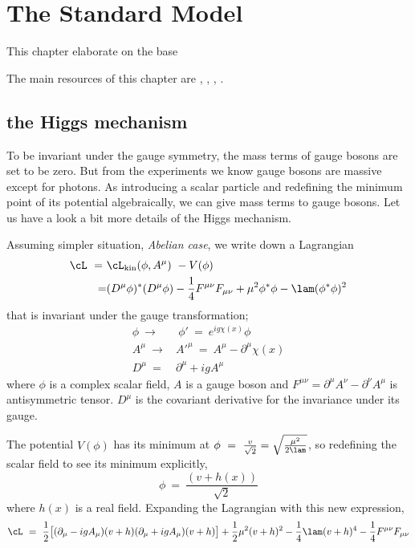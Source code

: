 \chapter{The Standard Model}
\label{sec:bsm}

This chapter elaborate on the base

The main resources of this chapter are , \cite{Koks:1976zec}, \cite{Bardon:1965sd}, 
\cite{deGroot:1978feq}.

\bigskip

\section{the Higgs mechanism}
To be invariant under the gauge symmetry, the mass terms of gauge bosons are set to be zero. 
But from the experiments we know gauge bosons are massive except for photons.
As introducing a scalar particle and redefining the minimum point of its potential algebraically, 
we can give mass terms to gauge bosons. Let us have a look a bit more details of the Higgs mechanism.

Assuming simpler situation, \emph{Abelian case}, we write down a Lagrangian 
\begin{align}
 \cL ~=~ &\cL_{\rm{kin}}(\phi,A^\mu) ~- V(\phi) \nonumber\\
  =& (D^\mu \phi)^* (D^\mu \phi) - \frac{1}{4}F^{\mu\nu}F_{\mu\nu} + \mu^2\phi^*\phi - \lam(\phi^*\phi)^2
\end{align}
that is invariant under the gauge transformation;
\begin{align}
 \phi ~\to &~\phi'~=~e^{ig\chi(x)}\phi \nonumber\\
 A^\mu ~\to& A'^\mu ~=~ A^\mu - \partial^\mu \chi(x) \nonumber\\
 D^\mu ~=~& \partial^\mu + i g A^\mu
\end{align}
where $\phi$ is a complex scalar field, $A$ is a gauge boson and $F^{\mu\nu}=\partial^\mu A^\nu - \partial^\nu A^\mu$ is antisymmetric tensor.
$D^\mu$ is the covariant derivative for the invariance under its gauge. 

The potential $V(\phi)$ has its minimum at $\phi~=~\frac{v}{\sqrt{2}}=\sqrt{\frac{\mu^2}{2\lam}}$, so 
redefining the scalar field to see its minimum explicitly, 
\begin{equation}
 \phi ~=~ \frac{(v+ h(x))}{\sqrt{2}} \nonumber
\end{equation}
where $h(x)$ is a real field. Expanding the Lagrangian with this new expression, 
\begin{align}
 \cL~=~\frac{1}{2}\big[ (\partial_\mu - igA_\mu)(v+h)(\partial_\mu + igA_\mu)(v+h) \big] 
 + \frac{1}{2}\mu^2 (v+h)^2 - \frac{1}{4}\lam(v+h)^4 - \frac{1}{4} F^{\mu\nu} F_{\mu\nu} \nonumber
\end{align}


